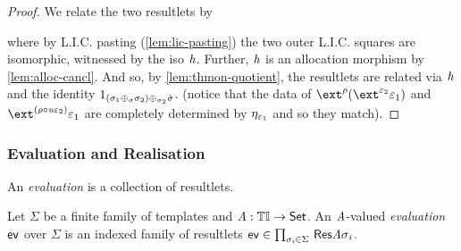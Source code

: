 \begin{proof}
    We relate the two resultlets by
    \begin{center}
    \end{center}
    where by L.I.C. pasting (\cref{lem:lic-pasting}) the two outer L.I.C. squares are isomorphic,
    witnessed by the iso $\mathit{h}$.
    Further, $\mathit{h}$ is an allocation morphism by \cref{lem:alloc-cancl}.
    And so, by \cref{lem:thmon-quotient}, the resultlets are related via $\mathit{h}$ and the identity $1_{(\sigma_1 \oplus_{\sigma} \sigma_2) \oplus_{\sigma_2} \hat\sigma}$.
    (notice that the data of $\ext^\rho(\ext^{\me_2}\me_1)$ and $\ext^{(\rho \comp \tinstU\me_2)}\me_1$ are completely determined by $\eta_{\varepsilon_1}$ and so they match).
\end{proof}

\subsubsection{Evaluation and Realisation}

An \emph{evaluation} is a collection of resultlets. 

\begin{definition}[Evaluation]
    Let $\Sigma$ be a finite family of templates and $\mathit{A} : {\mathbb{T}\mathbb{I}} \to \mathsf{Set}$.
    An $\mathit{A}$-valued \emph{evaluation} $\mathsf{ev}$ over $\Sigma$ is an indexed family of resultlets $\mathsf{ev} \in \prod_{\sigma_{\mathit{i}} \in \Sigma}\, \mathsf{Res}\mathit{A}\sigma_{\mathit{i}}$.
\end{definition}

